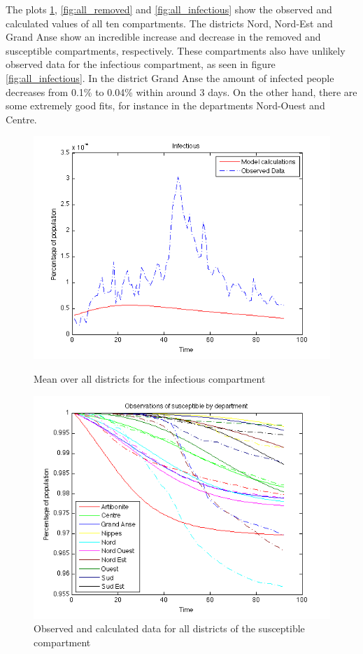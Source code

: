 \documentclass[11pt]{article}
\begin{document}
The plots \ref{fig:all_susceptible}, \ref{fig:all_removed} and \ref{fig:all_infectious} show the observed and calculated values of all ten compartments. The districts Nord, Nord-Est and Grand Anse show an incredible increase and decrease in the removed and susceptible compartments, respectively. These compartments also have unlikely observed data for the infectious compartment, as seen in figure \ref{fig:all_infectious}. In the district Grand Anse the amount of infected people decreases from  0.1\% to 0.04\% within around 3 days. On the other hand, there are some extremely good fits, for instance in the departments Nord-Ouest and Centre. 


\begin{figure}
  \begin{minipage}[t]{0.49\textwidth}
    \centering
    \includegraphics[width=\textwidth]{Bilder/infectious_mean.png} 
    \caption{Mean over all districts for the infectious compartment}
	\label{fig:mean_infectious}
  \end{minipage}
  \hspace{0.02\textwidth}
  \begin{minipage}[t]{0.49\textwidth}
    \centering
    \includegraphics[width=\textwidth]{Bilder/susceptible.png} 
    \caption{Observed and calculated data for all districts of the susceptible compartment}
	\label{fig:all_susceptible}
  \end{minipage}
  

\end{figure}
\end{document}
